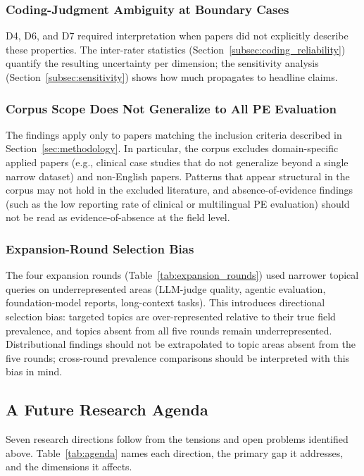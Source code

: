 \documentclass[acmsmall, nonacm, screen]{acmart}
\begin{document}
\subsubsection{Coding-Judgment Ambiguity at Boundary Cases}
\label{subsubsec:lim_coding}
D4, D6, and D7 required interpretation when papers did not
explicitly describe these properties. The inter-rater statistics
(Section~\ref{subsec:coding_reliability}) quantify the resulting
uncertainty per dimension; the sensitivity analysis
(Section~\ref{subsec:sensitivity}) shows how much propagates to
headline claims.

\subsubsection{Corpus Scope Does Not Generalize to All PE Evaluation}
\label{subsubsec:lim_scope}
The findings apply only to papers matching the inclusion criteria
described in Section~\ref{sec:methodology}. In particular, the
corpus excludes domain-specific applied papers (e.g., clinical case
studies that do not generalize beyond a single narrow dataset) and
non-English papers. Patterns that appear structural in the corpus
may not hold in the excluded literature, and absence-of-evidence
findings (such as the low reporting rate of clinical or multilingual
PE evaluation) should not be read as evidence-of-absence at the
field level.

\subsubsection{Expansion-Round Selection Bias}
\label{subsubsec:lim_expansion}
The four expansion rounds (Table~\ref{tab:expansion_rounds}) used
narrower topical queries on underrepresented areas (LLM-judge
quality, agentic evaluation, foundation-model reports, long-context
tasks). This introduces directional selection bias: targeted topics
are over-represented relative to their true field prevalence, and
topics absent from all five rounds remain underrepresented.
Distributional findings should not be extrapolated to topic areas
absent from the five rounds; cross-round prevalence comparisons
should be interpreted with this bias in mind.

\subsection{A Future Research Agenda}
\label{subsec:agenda}

Seven research directions follow from the tensions and open problems
identified above. Table~\ref{tab:agenda} names each direction, the
primary gap it addresses, and the dimensions it affects.
\end{document}
